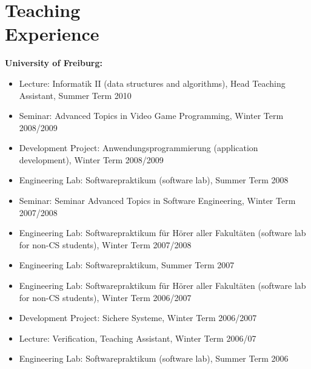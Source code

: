\section{\sc Teaching\\ Experience}

\textbf{University of Freiburg: }
\begin{itemize}
\item Lecture: Informatik II (data structures and algorithms), Head Teaching Assistant, Summer Term 2010
\item Seminar: Advanced Topics in Video Game Programming, Winter Term 2008/2009
\item Development Project: Anwendungsprogrammierung (application development), Winter Term 2008/2009 
\item Engineering Lab: Softwarepraktikum (software lab), Summer Term 2008
\item Seminar: Seminar Advanced Topics in Software Engineering, Winter Term 2007/2008
\item Engineering Lab: Softwarepraktikum f\"ur H\"orer aller Fakult\"aten (software lab for non-CS students), Winter Term 2007/2008
\item Engineering Lab: Softwarepraktikum, Summer Term 2007
\item Engineering Lab: Softwarepraktikum f\"ur H\"orer aller Fakult\"aten (software lab for non-CS students), Winter Term 2006/2007
\item Development Project: Sichere Systeme, Winter Term 2006/2007
\item Lecture: Verification, Teaching Assistant, Winter Term 2006/07
\item Engineering Lab: Softwarepraktikum (software lab), Summer Term 2006
\end{itemize}
